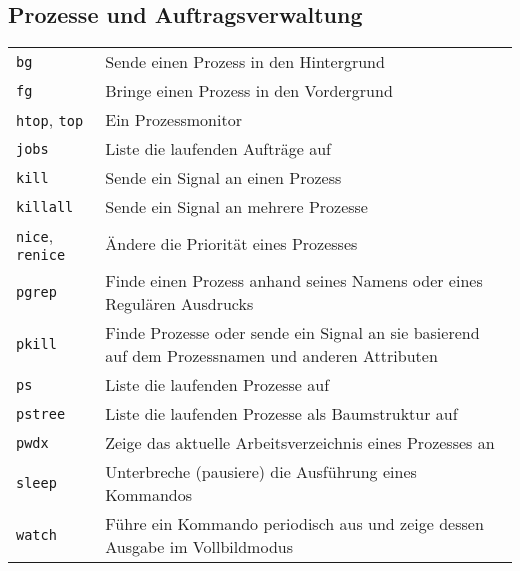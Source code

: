 \documentclass[10pt,a4paper]{article}
\begin{document}
\begin{multicols}{2}
\section{Prozesse und Auftragsverwaltung}
\begin{tabular}{ p{2.5cm} p{8.5cm} }
  \hline
  \texttt{bg} & Sende einen Prozess in den Hintergrund \\
  \rowcolor{Gray}
  \texttt{fg} & Bringe einen Prozess in den Vordergrund \\
  \texttt{htop}, \texttt{top} & Ein Prozessmonitor \\
  \rowcolor{Gray}
  \texttt{jobs} & Liste die laufenden Aufträge auf \\
  \texttt{kill} & Sende ein Signal an einen Prozess \\
  \rowcolor{Gray}
  \texttt{killall} & Sende ein Signal an mehrere Prozesse\\
  \texttt{nice}, \texttt{renice} & Ändere die Priorität eines Prozesses \\
  \rowcolor{Gray}
  \texttt{pgrep} & Finde einen Prozess anhand seines Namens oder eines Regulären Ausdrucks \\
  \texttt{pkill} & Finde Prozesse oder sende ein Signal an sie basierend auf dem Prozessnamen und anderen Attributen\\
  \rowcolor{Gray}
  \texttt{ps} & Liste die laufenden Prozesse auf \\
  \texttt{pstree} & Liste die laufenden Prozesse als Baumstruktur auf \\
  \rowcolor{Gray}
  \texttt{pwdx} & Zeige das aktuelle Arbeitsverzeichnis eines Prozesses an \\
  \texttt{sleep} & Unterbreche (pausiere) die Ausführung eines Kommandos \\
  \rowcolor{Gray}
  \texttt{watch} & Führe ein Kommando periodisch aus und zeige dessen Ausgabe im Vollbildmodus \\
  \hline
\end{tabular}


\end{multicols}
\end{document}
